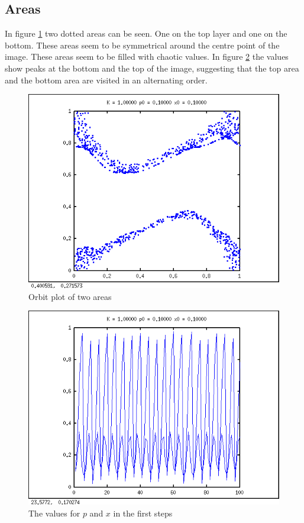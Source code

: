 \documentclass[a4paper,11pt]{article}
\begin{document}
\subsection*{Areas}
In figure \ref{areaorbit} two dotted areas can be seen. One on the top layer and one on the bottom. These areas seem to be symmetrical around the centre point of the image. These areas seem to be filled with chaotic values. In figure \ref{areaval} the values show peaks at the bottom and the top of the image, suggesting that the top area and the bottom area are visited in an alternating order.

\begin{figure}[H]
\centering
\includegraphics[width=.8\textwidth]{areaorbit.png}
\caption{Orbit plot of two areas}
\label{areaorbit}
\end{figure}

\newpage
\begin{figure}[H]
\centering
\includegraphics[width=.8\textwidth]{areavalues.png}
\caption{The values for $p$ and $x$ in the first steps }
\label{areaval}
\end{figure}
\end{document}
